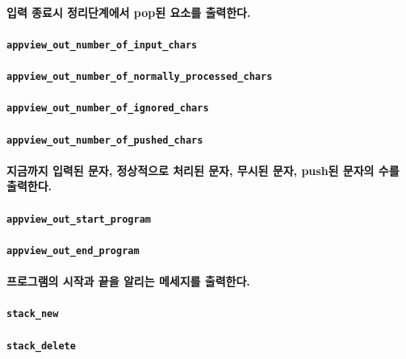 \documentclass[UTF8]{report}
\begin{document}
            \paragraph{%
                \normalfont 입력 종료시 정리단계에서 pop된 요소를 출력한다.
            }

            \paragraph{\texttt{appview\_out\_number\_of\_input\_chars}}
            \paragraph{\texttt{appview\_out\_number\_of\_normally\_processed\_chars}}
            \paragraph{\texttt{appview\_out\_number\_of\_ignored\_chars}}
            \paragraph{\texttt{appview\_out\_number\_of\_pushed\_chars}}
            \paragraph{%
                \normalfont 지금까지 입력된 문자, 정상적으로 처리된 문자, 무시된 문자, push된 문자의 수를 출력한다.
            }

            \paragraph{\texttt{appview\_out\_start\_program}}
            \paragraph{\texttt{appview\_out\_end\_program}}
            \paragraph{%
                \normalfont 프로그램의 시작과 끝을 알리는 메세지를 출력한다.
            }

            \paragraph{\texttt{stack\_new}}
            \paragraph{\texttt{stack\_delete}}
\end{document}
